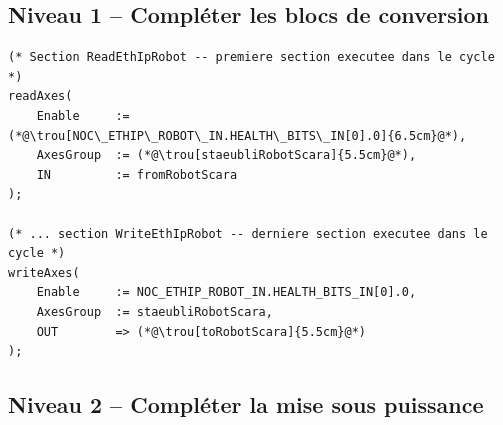 \subsection{Niveau 1 -- Compléter les blocs de conversion}

\begin{UPSTIactivite}

\begin{lstlisting}
(* Section ReadEthIpRobot -- premiere section executee dans le cycle *)
readAxes(
    Enable     := (*@\trou[NOC\_ETHIP\_ROBOT\_IN.HEALTH\_BITS\_IN[0].0]{6.5cm}@*),
    AxesGroup  := (*@\trou[staeubliRobotScara]{5.5cm}@*),
    IN         := fromRobotScara
);

(* ... section WriteEthIpRobot -- derniere section executee dans le cycle *)
writeAxes(
    Enable     := NOC_ETHIP_ROBOT_IN.HEALTH_BITS_IN[0].0,
    AxesGroup  := staeubliRobotScara,
    OUT        => (*@\trou[toRobotScara]{5.5cm}@*)
);
\end{lstlisting}
\end{UPSTIactivite}

\subsection{Niveau 2 -- Compléter la mise sous puissance}

